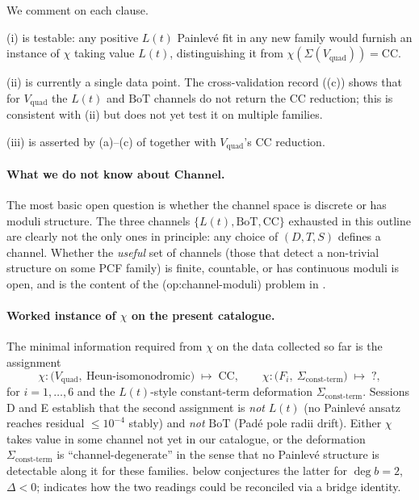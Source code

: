 \documentclass[11pt,reqno]{amsart}
\theoremstyle{plain}
\theoremstyle{definition}
\theoremstyle{remark}
\newcommand{\Channel}{\mathbf{Channel}}
\newcommand{\Lt}{L(t)}
\newcommand{\BoT}{\mathrm{BoT}}
\newcommand{\CC}{\mathrm{CC}}
\newcommand{\Vquad}{V_{\mathrm{quad}}}
\begin{document}
We comment on each clause.

\medskip
(i) is testable: any positive $\Lt$ Painlev\'e fit in any
new family would furnish an instance of $\chi$ taking value
$\Lt$, distinguishing it from $\chi(\Sigma(\Vquad)) = \CC$.

\medskip
(ii) is currently a single data point. The cross-validation
record ((c)) shows that for $\Vquad$ the
$\Lt$ and $\BoT$ channels do not return the $\CC$ reduction;
this is consistent with (ii) but does not yet test it on
multiple families.

\medskip
(iii) is asserted by (a)--(c) of  together
with $\Vquad$'s $\CC$ reduction.

\paragraph{What we do not know about $\Channel$.}
The most basic open question is whether the channel space is
discrete or has moduli structure. The three channels
$\{\Lt, \BoT, \CC\}$ exhausted in this outline are
clearly not the only ones in principle: any choice of
$(D, T, S)$ defines a channel. Whether the \emph{useful} set
of channels (those that detect a non-trivial structure on
some PCF family) is finite, countable, or has continuous
moduli is open, and is the content of the
\textsf{(op:channel-moduli)} problem in .

\paragraph{Worked instance of $\chi$ on the present catalogue.}
The minimal information required from $\chi$ on the data
collected so far is the assignment
\[
  \chi : \big( \Vquad,\ \text{Heun-isomonodromic}\big)
  \;\longmapsto\; \CC,
  \qquad
  \chi : \big( F_i,\ \Sigma_{\text{const-term}}\big)
  \;\longmapsto\; ?,
\]
for $i = 1, \ldots, 6$ and the $\Lt$-style constant-term
deformation $\Sigma_{\text{const-term}}$. Sessions D and
E establish that the second assignment is \emph{not} $\Lt$
(no Painlev\'e ansatz reaches residual $\le 10^{-4}$ stably)
and \emph{not} $\BoT$ (Pad\'e pole radii drift). Either
$\chi$ takes value in some channel not yet in our catalogue,
or the deformation $\Sigma_{\text{const-term}}$ is
``channel-degenerate'' in the sense that no Painlev\'e
structure is detectable along it for these families.
 below conjectures the latter for $\deg
b = 2$, $\Delta < 0$;  indicates how
the two readings could be reconciled via a bridge identity.
\end{document}
